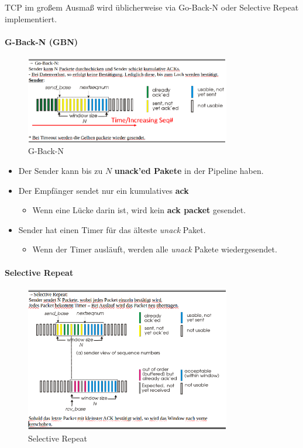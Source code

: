\documentclass{scrartcl}
\begin{document}
    TCP im großem Ausmaß wird üblicherweise via Go-Back-N oder Selective Repeat implementiert.
    
    \paragraph{G-Back-N (GBN)}
    \begin{figure}[h!]
        \centering
        \caption{G-Back-N}
        \includegraphics[width=0.8\textwidth]{GoBackN.png}
    \end{figure}

    \begin{itemize}
        \item Der Sender kann bis zu $N$ \textbf{unack'ed Pakete} in der Pipeline haben.
        \item Der Empfänger sendet nur ein kumulatives \textbf{ack} 
        \begin{itemize}
            \item Wenn eine Lücke darin ist, wird kein \textbf{ack packet} gesendet.
        \end{itemize}
        \item Sender hat einen Timer für das älteste \emph{unack} Paket.
        \begin{itemize}
            \item Wenn der Timer ausläuft, werden alle \emph{unack} Pakete wiedergesendet.
        \end{itemize}
    \end{itemize}
    
    
    \paragraph{Selective Repeat}
    \begin{figure}[h!]
        \centering
        \caption{Selective Repeat}
        \includegraphics[width=0.8\textwidth]{SelectiveRepeat.png}
    \end{figure}
  
\end{document}
